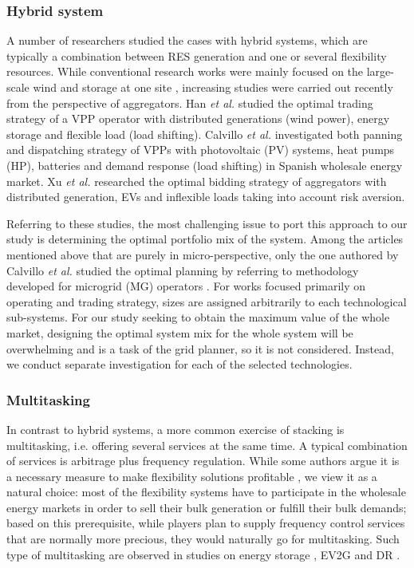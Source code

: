 \subsubsection{Hybrid system}
A number of researchers studied the cases with hybrid systems, which are typically a combination between RES generation and one or several flexibility resources. While conventional research works were mainly focused on the large-scale wind and storage at one site \cite{Bathurst2003,Denholm2009}, increasing studies were carried out recently from the perspective of aggregators. Han \textit{et al.} \cite{Han2017} studied the optimal trading strategy of a VPP operator with distributed generations (wind power), energy storage and flexible load (load shifting). 
Calvillo \textit{et al.} \cite{Calvillo2016} investigated both panning and dispatching strategy of VPPs with photovoltaic (PV) systems, heat pumps (HP), batteries and demand response (load shifting) in Spanish wholesale energy market. Xu \textit{et al.} \cite{Xu2017} researched the optimal bidding strategy of aggregators with distributed generation, EVs and inflexible loads taking into account risk aversion. 

Referring to these studies, the most challenging issue to port this approach to our study is determining the optimal portfolio mix of the system. Among the articles mentioned above that are purely in micro-perspective, only the one authored by Calvillo \textit{et al.} \cite{Calvillo2016} studied the optimal planning by referring to methodology developed for microgrid (MG) operators \cite{Martin-Martinez2016}. For works focused primarily on operating and trading strategy, sizes are assigned arbitrarily to each technological sub-systems. For our study seeking to obtain the maximum value of the whole market, designing the optimal system mix for the whole system will be overwhelming and is a task of the grid planner, so it is not considered. Instead, we conduct separate investigation for each of the selected technologies.

\subsubsection{Multitasking}
In contrast to hybrid systems, a more common exercise of stacking is multitasking, i.e. offering several services at the same time. A typical combination of services is arbitrage plus frequency regulation. While some authors argue it is a necessary measure to make flexibility solutions profitable \cite{Zucker2013,Megel2017}, we view it as a natural choice: most of the flexibility systems have to participate in the wholesale energy markets in order to sell their bulk generation or fulfill their bulk demands; based on this prerequisite, while players plan to supply frequency control services that are normally more precious, they would naturally go for multitasking. Such type of multitasking are observed in studies on energy storage \cite{Byrne2012, Berrada2016,Megel2017}, EV2G \cite{Sortomme2012,Cho2015,Alipour2017,Peng2017} and DR \cite{Roos2014}.


